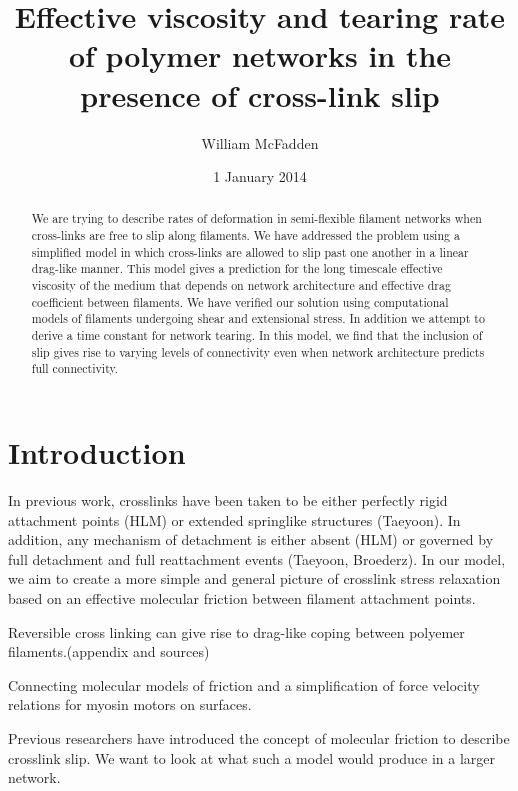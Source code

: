 \documentclass[prb,11pt]{revtex4-1}
\begin{document}
\title{Effective viscosity and tearing rate of polymer networks in the presence of cross-link slip}
\author{William McFadden}

\date{1 January 2014}

\begin{abstract}
We are trying to describe rates of deformation in semi-flexible filament networks when cross-links are free to slip along filaments.  We have addressed the problem using a simplified model in which cross-links are allowed to slip past one another in a linear drag-like manner.  This model gives a prediction for the long timescale effective viscosity of the medium that depends on network architecture and effective drag coefficient between filaments.  We have verified our solution using computational models of filaments undergoing shear and extensional stress.  In addition we attempt to derive a time constant for network tearing.  In this model, we find that the inclusion of slip gives rise to varying levels of connectivity even when network architecture predicts full connectivity.
\end{abstract}

\maketitle

\section{Introduction}

In previous work, crosslinks have been taken to be either perfectly rigid attachment points (HLM) or extended springlike structures (Taeyoon).  In addition, any mechanism of detachment is either absent (HLM) or governed by full detachment and full reattachment events (Taeyoon, Broederz).  In our model, we aim to create a more simple and general picture of crosslink stress relaxation based on an effective molecular friction between filament attachment points.

Reversible cross linking can give rise to drag-like coping between polyemer filaments.(appendix and sources)

Connecting molecular models of friction and a simplification of force velocity relations for myosin motors on surfaces.

Previous researchers have introduced the concept of molecular friction to describe crosslink slip.  We want to look at what such a model would produce in a larger network.
\end{document}
